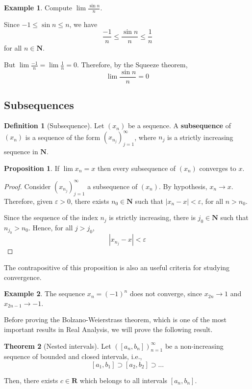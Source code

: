 \documentclass[12pt,a4paper]{article}
\theoremstyle{definition}
\newtheorem{theorem}{Theorem}[section]
\newtheorem{proposition}[theorem]{Proposition}
\newtheorem{example}{Example}[section]
\newtheorem{definition}{Definition}[section]
\begin{document}
\begin{example}
	Compute $\lim \frac{\sin n}{n}$.
	
	Since $-1 \leq \sin n \leq n$, we have \[ \frac{-1}{n} \leq \frac{\sin n}{n} \leq \frac{1}{n} \] for all $n \in \textbf{N}$.
	
	But $\lim \frac{-1}{n} = \lim \frac{1}{n} = 0$. Therefore, by the Squeeze theorem, \[ \lim \frac{\sin n}{n} = 0 \]
\end{example}

\subsection{Subsequences}

\begin{definition}[Subsequence]
	Let $(x_n)$ be a sequence. A \textbf{subsequence} of $(x_n)$ is a sequence of the form $(x_{n_j})_{j=1}^\infty$, where $n_j$ is a strictly increasing sequence in $\textbf{N}$. 
\end{definition}

\begin{proposition}
	If $\lim x_n = x$ then every subsequence of $(x_n)$ converges to $x$.
\end{proposition}

\begin{proof}
	Consider $(x_{n_j})_{j=1}^\infty$ a subsequence of $(x_n)$. By hypothesis, $x_n \longrightarrow x$. Therefore, given $\varepsilon > 0$, there exists $n_0 \in \textbf{N}$ such that $|x_n - x| < \varepsilon$, for all $n > n_0$.
	
	Since the sequence of the index $n_j$ is strictly increasing, there is $j_0 \in \textbf{N}$ such that $n_{j_0} > n_0$. Hence, for all $j > j_0$, \[ | x_{n_j} - x | < \varepsilon \]
\end{proof}

The contrapositive of this proposition is also an useful criteria for studying convergence.

\begin{example}
	The sequence $x_n = (-1)^n$ does not converge, since $x_{2n} \longrightarrow 1$ and $x_{2n-1} \longrightarrow -1$.
\end{example}

Before proving the Bolzano-Weierstrass theorem, which is one of the most important results in Real Analysis, we will prove the following result.

\begin{theorem}[Nested intervals]\label{nested-intervals}
	Let $([a_n, b_n])_{n=1}^\infty$ be a non-increasing sequence of bounded and closed intervals, i.e., \[ [a_1, b_1] \supset [a_2, b_2] \supset \ldots \]
	
	Then, there exists $c \in \textbf{R}$ which belongs to all intervals $[a_n, b_n]$.
\end{theorem}
\end{document}
